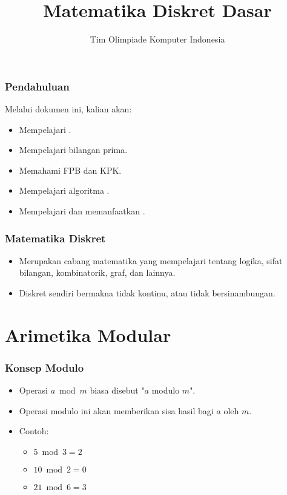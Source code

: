 

\title{Matematika Diskret Dasar}
\author{Tim Olimpiade Komputer Indonesia}
\date{}



\begin{frame}
\titlepage
\end{frame}

\begin{frame}
\frametitle{Pendahuluan}
Melalui dokumen ini, kalian akan:
\begin{itemize}
  \item Mempelajari .
  \item Mempelajari bilangan prima.
  \item Memahami FPB dan KPK.
  \item Mempelajari algoritma .
  \item Mempelajari dan memanfaatkan .
\end{itemize}
\end{frame}

\begin{frame}
\frametitle{Matematika Diskret}
\begin{itemize}
  \item Merupakan cabang matematika yang mempelajari tentang logika, sifat bilangan, kombinatorik, graf, dan lainnya.
  \item Diskret sendiri bermakna tidak kontinu, atau tidak bersinambungan.
\end{itemize}
\end{frame}

\section{Arimetika Modular}
\frame{\sectionpage}

\begin{frame}
\frametitle{Konsep Modulo}
\begin{itemize}
  \item Operasi $a \bmod m$ biasa disebut "$a$ modulo $m$".
  \item Operasi modulo ini akan memberikan sisa hasil bagi $a$ oleh $m$.
  \item Contoh: 
  \begin{itemize}
    \item $5 \bmod 3 = 2$ 
    \item $10 \bmod 2 = 0$
    \item $21 \bmod 6 = 3$
  \end{itemize}  
\end{itemize}
\end{frame}

